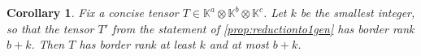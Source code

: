 \documentclass[a4paper,11pt,reqno]{amsart}
\newcommand{\bbK}{\mathbb{K}}
\renewcommand{\tilde}[1]{\widetilde{#1}}
\numberwithin{equation}{section}
\theoremstyle{definition}
\theoremstyle{plain}
\newtheorem{cor}[defn]{Corollary}
\theoremstyle{remark}
\begin{document}

\begin{cor}\label{cor:brankto1Gen}
Fix a concise tensor $T\in\bbK^a\otimes\bbK^b\otimes\bbK^c$. Let $k$ be the smallest {integer, so that} the tensor $T'$ from the statement of  \autoref{prop:reductionto1gen} has border rank $b+k$. Then $T$ has border rank at least $k$ and at most $b+k$.
\end{cor}
\end{document}
